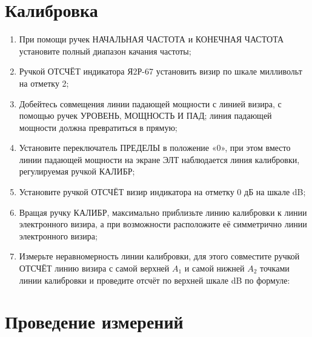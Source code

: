 \documentclass[a4paper]{article}
\begin{document}
    \section{Калибровка}

        \begin{enumerate}
            \item При помощи ручек НАЧАЛЬНАЯ ЧАСТОТА и КОНЕЧНАЯ ЧАСТОТА
                установите полный диапазон качания частоты;
            \item Ручкой ОТСЧЁТ индикатора Я2Р-67 установить визир по шкале
                милливольт на отметку 2;
            \item Добейтесь совмещения линии падающей мощности с линией визира,
                с помощью ручек УРОВЕНЬ, МОЩНОСТЬ И ПАД; линия падающей мощности
                должна превратиться в прямую;
            \item Установите переключатель ПРЕДЕЛЫ в положение «0», при этом
                вместо линии падающей мощности на экране ЭЛТ наблюдается линия
                калибровки, регулируемая ручкой КАЛИБР;
            \item Установите ручкой ОТСЧЁТ визир индикатора на отметку 0 дБ
                на шкале dB;
            \item Вращая ручку КАЛИБР, максимально приблизьте линию калибровки
                к линии электронного визира, а при возможности расположите её
                симметрично линии электронного визира;
            \item Измерьте неравномерность линии калибровки, для этого
                совместите ручкой ОТСЧЁТ линию визира с самой верхней \( A_1 \)
                и самой нижней \( A_2 \) точками линии калибровки и проведите
                отсчёт по верхней шкале dB по формуле:
        \end{enumerate}
    \section{Проведение измерений}
\end{document}
